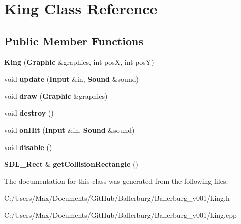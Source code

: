 \section{King Class Reference}
\label{class_king}
\subsection*{Public Member Functions}
\begin{DoxyCompactItemize}
\item 
{\bfseries King} ({\bf Graphic} \&graphics, int pos\+X, int pos\+Y)\label{class_king_ac559c45c410e8e356ac51f55dfec490e}

\item 
void {\bfseries update} ({\bf Input} \&in, {\bf Sound} \&sound)\label{class_king_ae8f4b316eb44ecf9a3f4cef12f20abb4}

\item 
void {\bfseries draw} ({\bf Graphic} \&graphics)\label{class_king_a302fd53f1beb9fd5c7f159ef58675d08}

\item 
void {\bfseries destroy} ()\label{class_king_a29c32eddd07de4c75100c06d969858ab}

\item 
void {\bfseries on\+Hit} ({\bf Input} \&in, {\bf Sound} \&sound)\label{class_king_a2c44b8cbdec8153b88041ee7298dc332}

\item 
void {\bfseries disable} ()\label{class_king_a22278859a9a802b9593bed6509c47808}

\item 
{\bf S\+D\+L\+\_\+\+Rect} \& {\bfseries get\+Collision\+Rectangle} ()\label{class_king_ae356b9770f435e7ddb98cfd3816df51c}

\end{DoxyCompactItemize}


The documentation for this class was generated from the following files\+:\begin{DoxyCompactItemize}
\item 
C\+:/\+Users/\+Max/\+Documents/\+Git\+Hub/\+Ballerburg/\+Ballerburg\+\_\+v001/king.\+h\item 
C\+:/\+Users/\+Max/\+Documents/\+Git\+Hub/\+Ballerburg/\+Ballerburg\+\_\+v001/king.\+cpp\end{DoxyCompactItemize}
